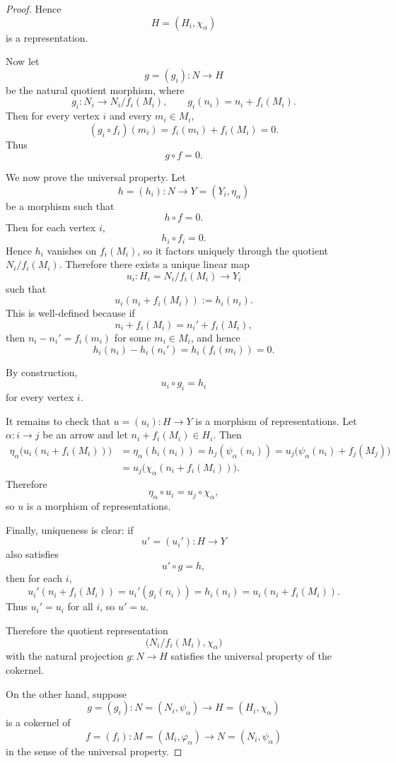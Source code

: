 \documentclass[11pt, a4paper]{article}
\begin{document}
\begin{enumerate}[leftmargin=*, label=\textbf{\arabic*.}]
\begin{proof}
    Hence
    \[
    H=(H_i,\chi_\alpha)
    \]
    is a representation.
    
    Now let
    \[
    g=(g_i):N\to H
    \]
    be the natural quotient morphism, where
    \[
    g_i:N_i\to N_i/f_i(M_i),\qquad g_i(n_i)=n_i+f_i(M_i).
    \]
    Then for every vertex $i$ and every $m_i\in M_i$,
    \[
    (g_i\circ f_i)(m_i)=f_i(m_i)+f_i(M_i)=0.
    \]
    Thus
    \[
    g\circ f=0.
    \]
    
    We now prove the universal property. Let
    \[
    h=(h_i):N\to Y=(Y_i,\eta_\alpha)
    \]
    be a morphism such that
    \[
    h\circ f=0.
    \]
    Then for each vertex $i$,
    \[
    h_i\circ f_i=0.
    \]
    Hence $h_i$ vanishes on $f_i(M_i)$, so it factors uniquely through the quotient
    $N_i/f_i(M_i)$. Therefore there exists a unique linear map
    \[
    u_i:H_i=N_i/f_i(M_i)\to Y_i
    \]
    such that
    \[
    u_i(n_i+f_i(M_i)):=h_i(n_i).
    \]
    This is well-defined because if
    \[
    n_i+f_i(M_i)=n_i'+f_i(M_i),
    \]
    then $n_i-n_i'=f_i(m_i)$ for some $m_i\in M_i$, and hence
    \[
    h_i(n_i)-h_i(n_i')=h_i(f_i(m_i))=0.
    \]
    
    By construction,
    \[
    u_i\circ g_i=h_i
    \]
    for every vertex $i$.
    
    It remains to check that $u=(u_i):H\to Y$ is a morphism of representations.
    Let $\alpha:i\to j$ be an arrow and let $n_i+f_i(M_i)\in H_i$. Then
    \begin{align*}
    \eta_\alpha\bigl(u_i(n_i+f_i(M_i))\bigr)
    &=\eta_\alpha(h_i(n_i))
    =h_j(\psi_\alpha(n_i))
    =u_j\bigl(\psi_\alpha(n_i)+f_j(M_j)\bigr)\\
    &=u_j\bigl(\chi_\alpha(n_i+f_i(M_i))\bigr).
    \end{align*}
    Therefore
    \[
    \eta_\alpha\circ u_i=u_j\circ \chi_\alpha,
    \]
    so $u$ is a morphism of representations.
    
    Finally, uniqueness is clear: if
    \[
    u'=(u_i'):H\to Y
    \]
    also satisfies
    \[
    u'\circ g=h,
    \]
    then for each $i$,
    \[
    u_i'(n_i+f_i(M_i))
    =u_i'(g_i(n_i))
    =h_i(n_i)
    =u_i(n_i+f_i(M_i)).
    \]
    Thus $u_i'=u_i$ for all $i$, so $u'=u$.
    
    Therefore the quotient representation
    \[
    \bigl(N_i/f_i(M_i),\chi_\alpha\bigr)
    \]
    with the natural projection $g:N\to H$ satisfies the universal property of the cokernel.
  
        On the other hand, suppose
        \[
        g=(g_i):N=(N_i,\psi_\alpha)\to H=(H_i,\chi_\alpha)
        \]
        is a cokernel of
        \[
        f=(f_i):M=(M_i,\varphi_\alpha)\to N=(N_i,\psi_\alpha)
        \]
        in the sense of the universal property.
        

\end{proof}
\end{enumerate}
\end{document}
